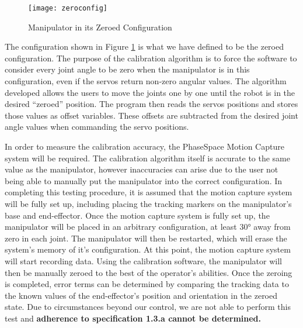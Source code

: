 \begin{figure}[htp]
  \centering
  \texttt{[image: zeroconfig]}
  \caption{Manipulator in its Zeroed Configuration}
  \label{fig:zero2}
\end{figure}

\newpage
The configuration shown in Figure \ref{fig:zero2} is what we have defined to be the zeroed configuration. The purpose of the calibration algorithm is to force the software to consider every joint angle to be zero when the manipulator is in this configuration, even if the servos return non-zero angular values. The algorithm developed allows the users to move the joints one by one until the robot is in the desired “zeroed” position. The program then reads the servos positions and stores those values as offset variables. These offsets are subtracted from the desired joint angle values when commanding the servo positions.

In order to measure the calibration accuracy, the PhaseSpace Motion Capture system will be required. The calibration algorithm itself is accurate to the same value as the manipulator, however inaccuracies can arise due to the user not being able to manually put the manipulator into the correct configuration. In completing this testing procedure, it is assumed that the motion capture system will be fully set up, including placing the tracking markers on the manipulator’s base and end-effector. Once the motion capture system is fully set up, the manipulator will be placed in an arbitrary configuration, at least 30° away from zero in each joint. The manipulator will then be restarted, which will erase the system’s memory of it’s configuration. At this point, the motion capture system will start recording data. Using the calibration software, the manipulator will then be manually zeroed to the best of the operator’s abilities. Once the zeroing is completed, error terms can be determined by comparing the tracking data to the known values of the end-effector’s position and orientation in the zeroed state. Due to circumstances beyond our control, we are not able to perform this test and \textbf{adherence to specification 1.3.a cannot be determined.}

